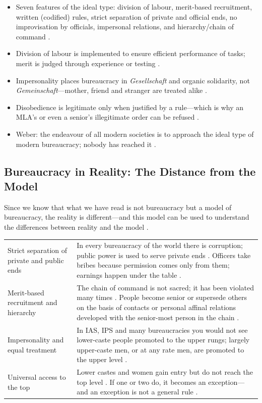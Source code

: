 \begin{QuickRevision}
\begin{itemize}
    \item Seven features of the ideal type: division of labour, merit-based recruitment, written (codified) rules, strict separation of private and official ends, no improvisation by officials, impersonal relations, and hierarchy/chain of command .
    \item Division of labour is implemented to ensure efficient performance of tasks; merit is judged through experience or testing .
    \item Impersonality places bureaucracy in \textit{Gesellschaft} and organic solidarity, not \textit{Gemeinschaft}---mother, friend and stranger are treated alike .
    \item Disobedience is legitimate only when justified by a rule---which is why an MLA's or even a senior's illegitimate order can be refused .
    \item Weber: the endeavour of all modern societies is to approach the ideal type of modern bureaucracy; nobody has reached it .
\end{itemize}
\end{QuickRevision}

\subsection{Bureaucracy in Reality: The Distance from the Model}
Since we know that what we have read is not bureaucracy but a model of bureaucracy, the reality is different---and this model can be used to understand the differences between reality and the model .

\vspace{6pt}
\noindent
\begin{tabularx}{\textwidth}{>{\hsize}Y >{\hsize}Y}
\toprule
{}
 &  \\
\midrule
Strict separation of private and public ends & In every bureaucracy of the world there is corruption; public power is used to serve private ends . Officers take bribes because permission comes only from them; earnings happen under the table . \\
\midrule
Merit-based recruitment and hierarchy & The chain of command is not sacred; it has been violated many times . People become senior or supersede others on the basis of contacts or personal affinal relations developed with the senior-most person in the chain . \\
\midrule
Impersonality and equal treatment & In IAS, IPS and many bureaucracies you would not see lower-caste people promoted to the upper rungs; largely upper-caste men, or at any rate men, are promoted to the upper level . \\
\midrule
Universal access to the top & Lower castes and women gain entry but do not reach the top level . If one or two do, it becomes an exception---and an exception is not a general rule . \\
\bottomrule
\end{tabularx}
\vspace{6pt}

